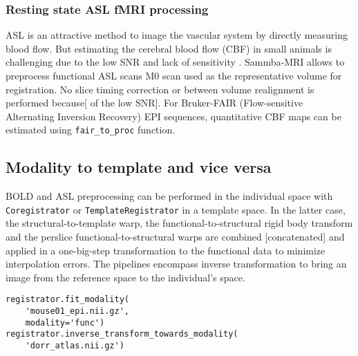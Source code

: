 \documentclass[utf8, a4paper, final, crop]{frontiersSCNS} %
\newcommand{\pythoninline}[1]{\texttt{#1}}
\begin{document}
%
\subsubsection{Resting state ASL fMRI processing}

ASL is an attractive method 
to image the vascular system by directly measuring blood flow.
But estimating the cerebral blood flow (CBF) in small animals is challenging due 
to the low SNR and lack of sensitivity \citep{kober2008experimental}.
Sammba-MRI allows to preprocess functional ASL scans M0 scan used 
as the representative volume for registration. No slice timing correction
or between volume realignment is performed because[ of the low SNR].
For Bruker-FAIR (Flow-sensitive Alternating Inversion Recovery) EPI sequences,
quantitative   CBF   maps can be estimated using \pythoninline{fair_to_proc} 
function.

\subsection{Modality to template and vice versa}

BOLD and ASL preprocessing can be performed in the individual space with
\pythoninline{Coregistrator} or \pythoninline{TemplateRegistrator}
in a template space.
In the latter case, the structural-to-template warp, the functional-to-structural 
rigid body transform and the perslice functional-to-structural warps are %
combined 
[concatenated] and applied in a one-big-step transformation
to the functional data to minimize interpolation errors.
The pipelines encompass inverse transformation to bring an image from 
the reference space to the individual's space.


\begin{verbatim}
registrator.fit_modality(
    'mouse01_epi.nii.gz',
    modality='func')
registrator.inverse_transform_towards_modality(
    'dorr_atlas.nii.gz')
\end{verbatim}
\end{document}
